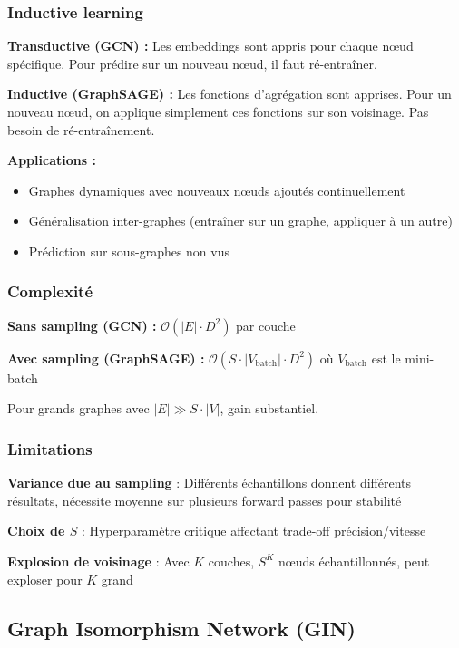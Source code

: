 \subsubsection{Inductive learning}

\textbf{Transductive (GCN) :}
Les embeddings sont appris pour chaque nœud spécifique. Pour prédire sur un nouveau nœud, il faut ré-entraîner.

\textbf{Inductive (GraphSAGE) :}
Les fonctions d'agrégation sont apprises. Pour un nouveau nœud, on applique simplement ces fonctions sur son voisinage. Pas besoin de ré-entraînement.

\textbf{Applications :}
\begin{itemize}
    \item Graphes dynamiques avec nouveaux nœuds ajoutés continuellement
    \item Généralisation inter-graphes (entraîner sur un graphe, appliquer à un autre)
    \item Prédiction sur sous-graphes non vus
\end{itemize}

\subsubsection{Complexité}

\textbf{Sans sampling (GCN) :} $\mathcal{O}(|E| \cdot D^2)$ par couche

\textbf{Avec sampling (GraphSAGE) :} $\mathcal{O}(S \cdot |V_{\text{batch}}| \cdot D^2)$ où $V_{\text{batch}}$ est le mini-batch

Pour grands graphes avec $|E| \gg S \cdot |V|$, gain substantiel.

\subsubsection{Limitations}

\textbf{Variance due au sampling} : Différents échantillons donnent différents résultats, nécessite moyenne sur plusieurs forward passes pour stabilité

\textbf{Choix de $S$} : Hyperparamètre critique affectant trade-off précision/vitesse

\textbf{Explosion de voisinage} : Avec $K$ couches, $S^K$ nœuds échantillonnés, peut exploser pour $K$ grand

\subsection{Graph Isomorphism Network (GIN)}

